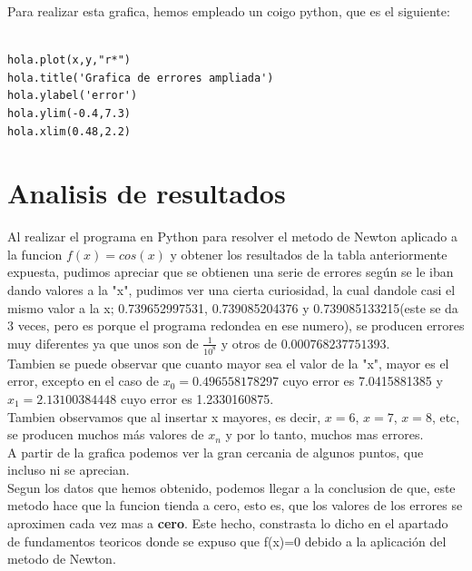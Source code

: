Para realizar esta grafica, hemos empleado un coigo python, que es el siguiente:
\begin{verbatim}

hola.plot(x,y,"r*")
hola.title('Grafica de errores ampliada')
hola.ylabel('error')
hola.ylim(-0.4,7.3)
hola.xlim(0.48,2.2)

\end{verbatim}


\section{Analisis de resultados}
Al realizar el programa en Python para resolver el metodo de Newton aplicado a la funcion $f(x)=cos(x)$ y obtener los resultados de la tabla anteriormente expuesta, pudimos apreciar que se obtienen una serie de errores según se le iban dando valores a la "x", pudimos ver una cierta curiosidad, la cual dandole casi el mismo valor a la x; 
0.739652997531, 0.739085204376 y 0.739085133215(este se da 3 veces, pero es porque el programa redondea en ese numero), se producen errores muy diferentes ya que unos son de $\frac {1}{10^8}$ y otros de $0.000768237751393$.\\
Tambien se puede observar que cuanto mayor sea el valor de la "x", mayor es el error, excepto en el caso de $x_0 =0.496558178297$ cuyo error es 7.0415881385 y $x_1=2.13100384448$ cuyo error es 1.2330160875.\\
Tambien observamos que al insertar x mayores, es decir, $x=6$, $x=7$, $x=8$, etc, se producen muchos más valores de $x_n$ y por lo tanto, muchos mas errores.\\ 
A partir de la grafica podemos ver la gran cercania de algunos puntos, que incluso ni se aprecian. \\
Segun los datos que hemos obtenido, podemos llegar a la conclusion de que, este metodo hace que la funcion tienda a cero, esto es, que los valores de los errores se aproximen cada vez mas a {\bf cero}. 
Este hecho, constrasta lo dicho en el apartado de fundamentos teoricos donde se expuso que f(x)=0 debido a la aplicación del metodo de Newton.
 